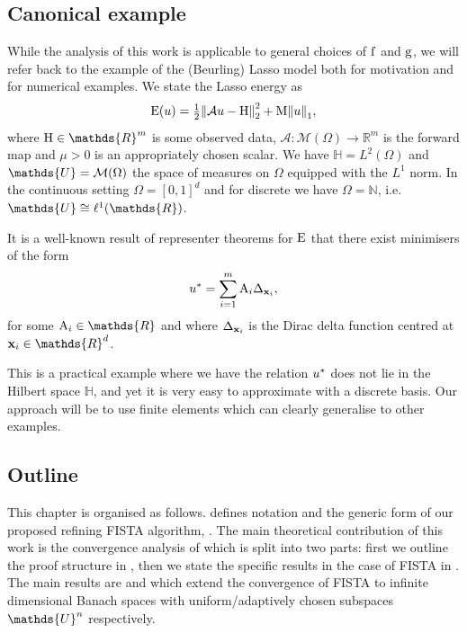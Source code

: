 \documentclass[10pt,a4paper,onecolumn]{article}
\numberwithin{equation}{section}
\let\F\mathds\let\C\mathcal\newcommand{\R}{\F{R}}\newcommand{\A}{\C{A}}
\newcommand{\norm}[1]{{\left\lVert #1 \right\rVert}}
\newcommand{\op}[1]{\operatorname{#1}}\newcommand{\overtext}[2]{\stackrel{\text{#1}}{#2}}
\renewcommand{\vec}{\mathbf}
\newcommand{\UCmath}[1]{%
	\begingroup
	\ucmathlist\uppercase\expandafter{#1}%
	\endgroup
}
\newcommand{\ucmathlist}{%
	\def\alpha{\mathrm{A}}%
	\def\beta{\mathrm{B}}%
	\let\gamma=\Gamma
	\let\delta=\Delta
	\def\epsilon{\mathrm{E}}%
	\def\varepsilon{\mathrm{E}}%
	\def\zeta{\mathrm{Z}}%
	\def\eta{\mathrm{H}}%
	\let\theta=\Theta
	\let\vartheta=\Theta
	\def\iota{\mathrm{I}}%
	\def\kappa{\mathrm{K}}%
	\let\lambda=\Lambda
	\def\mu{\mathrm{M}}%
	\def\nu{\mathrm{N}}%
	\let\xi=\Xi
	\let\pi=\Pi
	\let\varpi=\Pi
	\def\rho{\mathrm{P}}%
	\def\varrho{\mathrm{P}}%
	\let\sigma=\Sigma
	\def\tau{\mathrm{T}}%
	\let\upsilon=\Upsilon
	\let\phi=\Phi
	\let\varphi=\Phi
	\def\chi{\mathrm{X}}%
	\let\psi=\Psi
	\let\omega=\Omega
}
\newcommand{\caps}[1]{\UCmath{#1}}
\newcommand*{\Func}[1]{%
	\IfEqCase{#1}{%
		{0}{\op{E}}%
		{1}{\op{F}}%
		{2}{\op{G}}%
		{3}{\op{H}}%
	}[\op{F}#1]%
}
\newcommand*{\func}[1]{%
	\IfEqCase{#1}{%
		{0}{\op{e}}%
		{1}{\op{f}}%
		{2}{\op{g}}%
		{3}{\op{h}}%
	}[\op{f}#1]%
}
\newcommand*{\varf}[1]{%
	\IfEqCase{#1}{%
		{0}{u}%
		{1}{v}%
		{2}{w}%
	}[u#1]%
}
\newcommand*{\spcf}[1]{%
	\IfEqCase{#1}{%
		{0}{\F{U}}%
		{1}{\F{V}}%
		{2}{\F{W}}%
	}[\F{U}#1]%
}
\newcommand*{\varx}[1]{%
	\IfEqCase{#1}{%
		{0}{x}%
		{1}{y}%
		{2}{z}%
		{3}{r}%
	}[x#1]%
}
\newcommand*{\vars}[1]{%
	\IfEqCase{#1}{%
		{0}{\alpha}%
		{1}{\beta}%
		{2}{\gamma}%
		{3}{a}%
		{4}{b}%
		{5}{c}%
	}[k#1]%
}
\newcommand{\Domain}{\Omega}
\newcommand*{\Varx}[1]{\caps{\varx{#1}}}
\newcommand*{\vvarx}[1]{\vec{\varx{#1}}}\newcommand*{\vVarx}[1]{\vec{\Varx{#1}}}
\begin{document}
\subsection{Canonical example}
While the analysis of this work is applicable to general choices of $\func1$ and $\func2$, we will refer back to the example of the (Beurling) Lasso model both for motivation and for numerical examples. We state the Lasso energy as
\begin{equation}\label{eq: Lasso energy intro}
	\Func0(\varf0) = \tfrac12\norm{\A\varf0-\vdata0}_2^2 + \mu\norm{\varf0}_1,
\end{equation}
where $\vdata0\in\R^m$ is some observed data, $\A\colon \C M(\Domain)\to \R^m$ is the forward map and $\mu>0$ is an appropriately chosen scalar. We have $\F H = L^2(\Domain)$ and $\spcf0 = \C M(\Domain)$ the space of measures on $\Domain$ equipped with the $L^1$ norm. In the continuous setting $\Domain = [0,1]^d$ and for discrete we have $\Domain=\F N$, i.e. $\spcf0\cong\ell^1(\R)$.

It is a well-known result of representer theorems for $\Func0$ \citep{Unser2016,Boyer2019} that there exist minimisers of the form 
\begin{equation}
	\varf0^* = \sum_{i=1}^{m}\vars0_i\delta_{\vvarx0_i}, 
\end{equation}
for some $\vars0_i\in\R$ and where $\delta_{\vvarx0_i}$ is the Dirac delta function centred at $\vvarx0_i\in\R^d$.

This is a practical example where we have the relation $\varf0^*$ does not lie in the Hilbert space $\F H$, and yet it is very easy to approximate with a discrete basis. Our approach will be to use finite elements which can clearly generalise to other examples.


\subsection{Outline}
This chapter is organised as follows.  defines notation and the generic form of our proposed refining FISTA algorithm, . The main theoretical contribution of this work is the convergence analysis of  which is split into two parts: first we outline the proof structure in , then we state the specific results in the case of FISTA in . The main results are  and  which extend the convergence of FISTA to infinite dimensional Banach spaces with uniform/adaptively chosen subspaces $\spcf0^n$ respectively.
\end{document}
